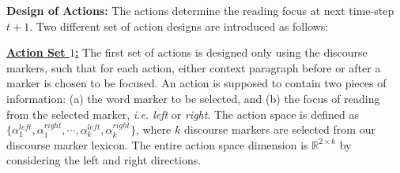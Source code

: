  \textbf{Design of Actions:} The actions determine the reading focus at next time-step $t+1$. 
 Two different set of action designs are introduced as follows:
 
{\bf{ \underline{Action Set $1$:}}}
The first set of actions is designed only using the discourse markers, such that for each action, either context paragraph before or after a marker is chosen to be focused. An action is supposed to contain two pieces of information: (a) the word marker to be selected, and (b) the focus of reading from the selected marker, \emph{i.e. left} or \emph{right}. The action space is defined as $\lbrace\alpha_{1}^{left},\alpha_{1}^{right}, \cdots,\alpha_{k}^{left},\alpha_{k}^{right}\rbrace$, where $k$ discourse markers are selected from our discourse marker lexicon. The entire action space dimension is $\mathbb{R}^{2\times k}$ by considering the left and right directions. %



